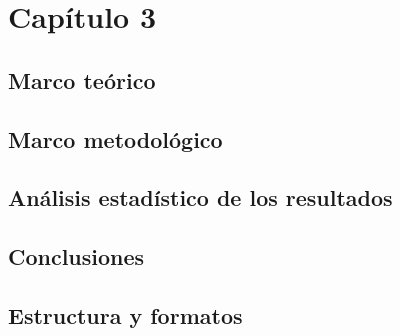 \newpage

\begin{center}
\vspace*{15em}
{\huge\bfseries\color{blue}{Capítulo 3}\par}
{\huge\bfseries\color{blue}{Tercer Capítulo}\par}
\end{center}
\chapter{Capítulo 3}
\section{Marco teórico}
\section{Marco metodológico}
\section{Análisis estadístico de los resultados}
\section{Conclusiones}
\section{Estructura y formatos}
